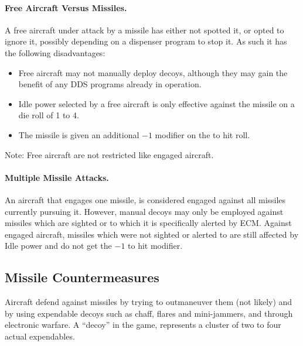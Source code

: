 \paragraph{Free Aircraft Versus Missiles.} A free aircraft under attack by a missile has either not spotted it, or opted to ignore it, possibly depending on a dispenser program to stop it. As such it has the following disadvantages:

\begin{itemize}


    \item Free aircraft may not manually deploy decoys, although they may gain the benefit of any DDS programs already in operation.

    \item Idle power selected by a free aircraft is only effective against the missile on a die roll of 1 to 4.

    \item The missile is given an additional $-1$ modifier on the to hit roll.

\end{itemize}

Note: Free aircraft are not restricted like engaged aircraft.

\paragraph{Multiple Missile Attacks.} An aircraft that engages one missile, is considered engaged against all missiles currently pursuing it. However, manual decoys may only be employed against missiles which are sighted or to which it is specifically alerted by ECM. Against engaged aircraft, missiles which were not sighted or alerted to are still affected by Idle power and do not get the $-1$ to hit modifier.

\subsection{Missile Countermeasures}

Aircraft defend against missiles by trying to outmaneuver them (not likely) and by using expendable decoys such as chaff, flares and mini-jammers, and through electronic warfare. A “decoy” in the game, represents a cluster of two to four actual expendables.

